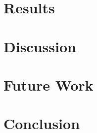 \documentclass[conference]{IEEEtran}
\begin{document}
\section{Results}


\section{Discussion}


\section{Future Work}


\section{Conclusion}




\end{document}

